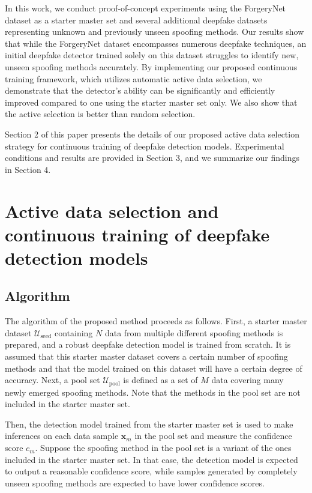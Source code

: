 \documentclass[english]{lni}
\begin{document}
In this work, we conduct proof-of-concept experiments using the ForgeryNet dataset \cite{he2021forgerynet} as a starter master set and several additional deepfake datasets representing unknown and previously unseen spoofing methods. Our results show that while the ForgeryNet dataset encompasses numerous deepfake techniques, an initial deepfake detector trained solely on this dataset struggles to identify new, unseen spoofing methods accurately. By implementing our proposed continuous training framework, which utilizes automatic active data selection, we demonstrate that the detector's ability can be significantly and efficiently improved compared to one using the starter master set only. We also show that the active selection is better than random selection. 

Section 2 of this paper presents the details of our proposed active data selection strategy for continuous training of deepfake detection models. Experimental conditions and results are provided in Section 3, and we summarize our findings in Section 4. 

\section{Active data selection and continuous training of deepfake detection models}

\subsection{Algorithm}

The algorithm of the proposed method proceeds as follows. First, a starter master dataset $\mathcal{U}_{\text{seed}}$ containing $N$ data from multiple different spoofing methods is prepared, and a robust deepfake detection model is trained from scratch. It is assumed that this starter master dataset covers a certain number of spoofing methods and that the model trained on this dataset will have a certain degree of accuracy. Next, a pool set $\mathcal{U}_{\text{pool}}$ is defined as a set of $M$ data covering many newly emerged spoofing methods. Note that the methods in the pool set are not included in the starter master set. 

Then, the detection model trained from the starter master set is used to make inferences on each data sample $\boldsymbol{x}_{m}$ in the pool set and measure the confidence score $c_m$. Suppose the spoofing method in the pool set is a variant of the ones included in the starter master set. In that case, the detection model is expected to output a reasonable confidence score, while samples generated by completely unseen spoofing methods are expected to have lower confidence scores.
\end{document}
